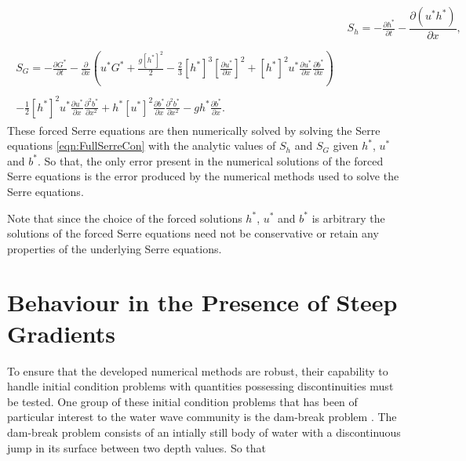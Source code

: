 \begin{align*}
&  S_{h} = -\frac{\partial h^*}{\partial t} - \dfrac{\partial (u^*h^*)}{\partial x} ,  \\ \nonumber \\
\begin{split}
S_{G} = -\frac{\partial G^*}{\partial t}  - \frac{\partial}{\partial x} \left( {u}^* G^* + \frac{g\left[h^*\right]^2}{2} - \frac{2}{3}\left[h^*\right]^3 \left[\frac{\partial {u}^*}{\partial x}\right]^2 + \left[h^*\right]^2 {u^*}\frac{\partial {u}^*}{\partial x}\frac{\partial b^*}{\partial x} \right) \\ \\ - \frac{1}{2}\left[h^*\right]^2 {u}^* \frac{\partial {u}^*}{\partial x} \frac{\partial^2 b^*}{\partial x^2}  + h^* {\left[u^*\right]}^2\frac{\partial b^*}{\partial x}\frac{\partial^2 b^*}{\partial x^2} - gh^*\frac{\partial b^*}{\partial x}.
\end{split}
\end{align*} 
These forced Serre equations are then numerically solved by solving the Serre equations \eqref{eqn:FullSerreCon} with the analytic values of $S_{h}$ and $S_{G}$ given $h^*$, $u^*$ and $b^*$. So that, the only error present in the numerical solutions of the forced Serre equations is the error produced by the numerical methods used to solve the Serre equations.

Note that since the choice of the forced solutions $h^*$, $u^*$ and $b^*$ is arbitrary the solutions of the forced Serre equations need not be conservative or retain any properties of the underlying Serre equations. 


\section{Behaviour in the Presence of Steep Gradients}
To ensure that the developed numerical methods are robust, their capability to handle initial condition problems with quantities possessing discontinuities must be tested. One group of these initial condition problems that has been of particular interest to the water wave community is the dam-break problem \cite{El-etal-2006,Hank-etal-2010-2034,Mitsotakis-etal-2014,Mitsotakis-etal-2017,doCarmo-etal-2018-404}. The dam-break problem consists of an intially still body of water with a discontinuous jump in its surface between two depth values. So that

